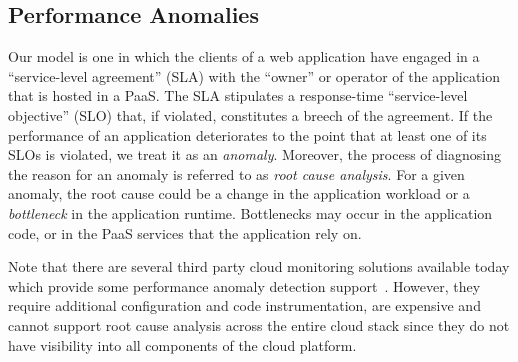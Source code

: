 \subsection{Performance Anomalies}
Our model is one in which the clients of a web application have engaged in a
``service-level agreement'' (SLA)
with the ``owner'' or operator of the application that is hosted in a PaaS.  The SLA
stipulates a response-time ``service-level objective'' (SLO) that, if violated, constitutes a breech of the
agreement.
If the performance of an application deteriorates to the
point that at least one of its SLOs is violated, we treat it as an \textit{anomaly}. Moreover, the process
of diagnosing the reason for 
an anomaly is referred to as \textit{root cause analysis}.
For a given anomaly, the root cause could be a change in the application workload or
a \textit{bottleneck} in the application runtime. Bottlenecks may occur in the application code, 
or in the PaaS services that the application rely on.



Note that there are several
third party cloud monitoring solutions available today which provide some performance
anomaly detection support~\cite{newrelic,datadog,dynatrace}. 
However, they require additional configuration and code instrumentation, are expensive
and cannot support root cause analysis across the entire cloud stack since they do not
have visibility into all components of the cloud platform.

